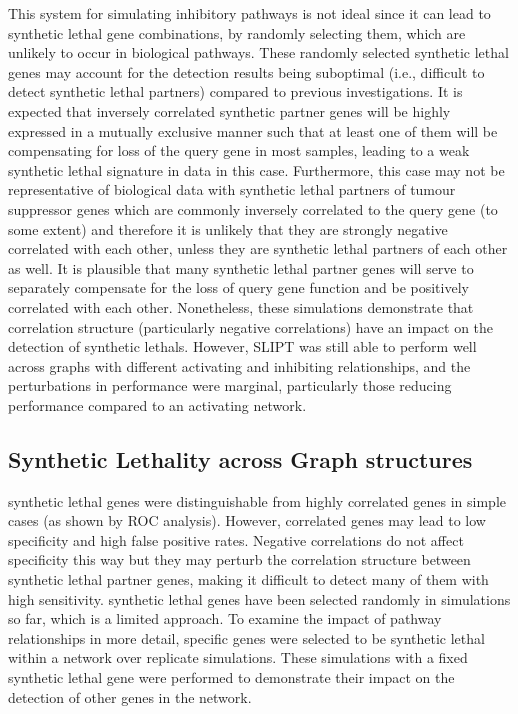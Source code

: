 This system for simulating inhibitory pathways is not ideal since it can lead to \gls{synthetic lethal} gene combinations, by randomly selecting them, which are unlikely to occur in biological pathways. These randomly selected \gls{synthetic lethal} genes may account for the detection results being suboptimal (i.e., difficult to detect \gls{synthetic lethal} partners) compared to previous investigations. It is expected that inversely correlated synthetic partner genes will be highly expressed in a mutually exclusive manner such that at least one of them will be compensating for loss of the query gene in most samples, leading to a weak \gls{synthetic lethal} signature in  data in this case. Furthermore, this case may not be representative of biological data with \gls{synthetic lethal} partners of \gls{tumour suppressor} genes which are commonly inversely correlated to the query gene (to some extent) and therefore it is unlikely that they are strongly negative correlated with each other, unless they are \gls{synthetic lethal} partners of each other as well. It is plausible that many \gls{synthetic lethal} partner genes will serve to separately compensate for the loss of query gene function and be positively correlated with each other. Nonetheless, these simulations demonstrate that correlation structure (particularly negative correlations) have an impact on the detection of \glspl{synthetic lethal}. However, \gls{SLIPT} was still able to perform well across \glspl{graph} with different activating and inhibiting relationships, and the perturbations in performance were marginal, particularly those reducing performance compared to an activating network.  

\FloatBarrier

\subsection{Synthetic Lethality across Graph structures}
\label{chapt5:graphsim_str}

\FloatBarrier

\Gls{synthetic lethal} genes were distinguishable from highly correlated genes in simple cases (as shown by \gls{ROC} analysis). However, correlated genes may lead to low specificity and high false positive rates. Negative correlations do not affect specificity this way but they may perturb the correlation structure between \gls{synthetic lethal} partner genes, making it difficult to detect many of them with high sensitivity. \Gls{synthetic lethal} genes have been selected randomly in simulations so far, which is a limited approach. To examine the impact of pathway relationships in more detail, specific genes were selected to be \gls{synthetic lethal} within a network over replicate simulations. %
These simulations with a fixed \gls{synthetic lethal} gene were performed to demonstrate their impact on the detection of other genes in the network. %

